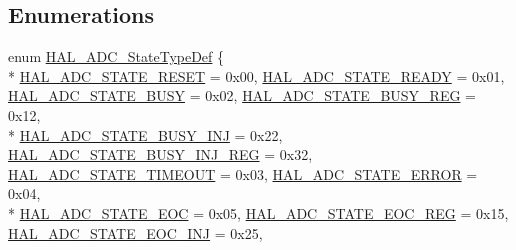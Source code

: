 \subsection*{Enumerations}
\begin{DoxyCompactItemize}
\item 
enum \hyperlink{group___a_d_c___exported___types_gafd66db22d830742b403c1f7f32d4630e}{H\+A\+L\+\_\+\+A\+D\+C\+\_\+\+State\+Type\+Def} \{ \\*
\hyperlink{group___a_d_c___exported___types_ggafd66db22d830742b403c1f7f32d4630ea0a8dc247045fffb859639f78670970bd}{H\+A\+L\+\_\+\+A\+D\+C\+\_\+\+S\+T\+A\+T\+E\+\_\+\+R\+E\+S\+ET} = 0x00, 
\hyperlink{group___a_d_c___exported___types_ggafd66db22d830742b403c1f7f32d4630ea80ed6f45e533fb9b25313197743df45f}{H\+A\+L\+\_\+\+A\+D\+C\+\_\+\+S\+T\+A\+T\+E\+\_\+\+R\+E\+A\+DY} = 0x01, 
\hyperlink{group___a_d_c___exported___types_ggafd66db22d830742b403c1f7f32d4630ead1b790ee536ba17dc1dc8e1810a61369}{H\+A\+L\+\_\+\+A\+D\+C\+\_\+\+S\+T\+A\+T\+E\+\_\+\+B\+U\+SY} = 0x02, 
\hyperlink{group___a_d_c___exported___types_ggafd66db22d830742b403c1f7f32d4630eae41abc22307997e2c99410e749bba59c}{H\+A\+L\+\_\+\+A\+D\+C\+\_\+\+S\+T\+A\+T\+E\+\_\+\+B\+U\+S\+Y\+\_\+\+R\+EG} = 0x12, 
\\*
\hyperlink{group___a_d_c___exported___types_ggafd66db22d830742b403c1f7f32d4630eac3a54423cfd0d83901bd17c6696d81eb}{H\+A\+L\+\_\+\+A\+D\+C\+\_\+\+S\+T\+A\+T\+E\+\_\+\+B\+U\+S\+Y\+\_\+\+I\+NJ} = 0x22, 
\hyperlink{group___a_d_c___exported___types_ggafd66db22d830742b403c1f7f32d4630eab7aba96942579addd8506609317094e7}{H\+A\+L\+\_\+\+A\+D\+C\+\_\+\+S\+T\+A\+T\+E\+\_\+\+B\+U\+S\+Y\+\_\+\+I\+N\+J\+\_\+\+R\+EG} = 0x32, 
\hyperlink{group___a_d_c___exported___types_ggafd66db22d830742b403c1f7f32d4630ea3baf09bb91e728be72bfe236208d20c3}{H\+A\+L\+\_\+\+A\+D\+C\+\_\+\+S\+T\+A\+T\+E\+\_\+\+T\+I\+M\+E\+O\+UT} = 0x03, 
\hyperlink{group___a_d_c___exported___types_ggafd66db22d830742b403c1f7f32d4630ea8cb47a47374f50216663d39c58683d3a}{H\+A\+L\+\_\+\+A\+D\+C\+\_\+\+S\+T\+A\+T\+E\+\_\+\+E\+R\+R\+OR} = 0x04, 
\\*
\hyperlink{group___a_d_c___exported___types_ggafd66db22d830742b403c1f7f32d4630eadf8131952ee3a76a31f833fc70c9acc2}{H\+A\+L\+\_\+\+A\+D\+C\+\_\+\+S\+T\+A\+T\+E\+\_\+\+E\+OC} = 0x05, 
\hyperlink{group___a_d_c___exported___types_ggafd66db22d830742b403c1f7f32d4630ea2ef0a3c19e949a247549ac4274361e87}{H\+A\+L\+\_\+\+A\+D\+C\+\_\+\+S\+T\+A\+T\+E\+\_\+\+E\+O\+C\+\_\+\+R\+EG} = 0x15, 
\hyperlink{group___a_d_c___exported___types_ggafd66db22d830742b403c1f7f32d4630ea6ef78197eb20289a8b664bdf83256fca}{H\+A\+L\+\_\+\+A\+D\+C\+\_\+\+S\+T\+A\+T\+E\+\_\+\+E\+O\+C\+\_\+\+I\+NJ} = 0x25, 

\end{DoxyCompactItemize}
